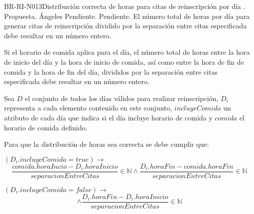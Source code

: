 \begin{BusinessRule}{BR-RI-N013}{Distribución correcta de horas para citas de reinscripción por día}
	{\bcCondition}   %
	{\btTimer}    %
	{\blControlling}    %
	.
	\BRItem[Estado] Propuesta.
	 Ángeles 
	 Pendiente.
	 Pendiente.
	\BRItem[Descripción] El número total de horas por día para generar citas de reinscripción dividido por la separación entre citas especificada debe resultar en un número entero. 
	
	Si el horario de comida aplica para el día, el número total de horas entre la hora de inicio del día y la hora de inicio de comida, así como entre la hora de fin de comida y la hora de fin del día, divididos por la separación entre citas especificada debe resultar en un número entero.
	
	\BRItem[Sentencia] Sea $D$ el conjunto de todos los días válidos para realizar reinscripción, $D_i$ representa a cada elemento contenido en este conjunto, $incluyeComida$ un atributo de cada día que indica si el día incluye horario de comida y $comida$ el horario de comida definido.
	
	Para que la distribución de horas sea correcta se debe cumplir que:
	
	$ (D_i.incluyeComida = true) \rightarrow $ \\
	$$  \frac{comida.horaIncio - D_i.horaInicio}{separacionEntreCitas} \in \mathbb{N}  \land \frac{D_i.horaFin - comida.horaFin}{separacionEntreCitas} \in \mathbb{N}$$

	$ (D_i.incluyeComida = false) \rightarrow $ \\
	$$  \land \frac{D_i.horaFin - D_i.horaInicio}{separacionEntreCitas} \in \mathbb{N}  $$

%
%	
%	
	

\end{BusinessRule}
